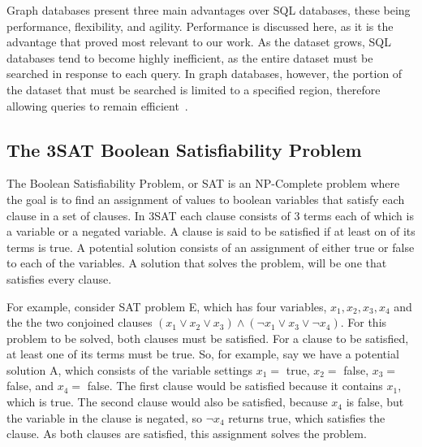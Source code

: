 \documentclass[12pt]{article}
\begin{document}
Graph databases present three main advantages over SQL databases, these being performance, flexibility, and agility. Performance is discussed here, as it is the advantage that proved most relevant to our work. As the dataset grows, SQL databases tend to become highly inefficient, as the entire dataset must be searched in response to each query. In graph databases, however, the portion of the dataset that must be searched is limited to a specified region, therefore allowing queries to remain efficient~\cite{GraphDatabases:2013}.




\subsection{The 3SAT Boolean Satisfiability Problem}
\label{sec:3sat}
The Boolean Satisfiability Problem, or SAT is an NP-Complete problem where the goal is to find an assignment of values to boolean variables that satisfy each clause in a set of clauses. In 3SAT each clause consists of 3 terms each of which is a variable or a negated variable. A clause is said to be satisfied if at least on of its terms is true. A potential solution consists of an assignment of either true or false to each of the variables. A solution that solves the problem, will be one that satisfies every clause. 

For example, consider SAT problem E, which has four variables, $x_{1}, x_{2}, x_{3}, x_{4}$ and the the two conjoined clauses $(x_{1} \vee x_{2} \vee x_{3}) \wedge (\neg x_{1} \vee x_{3} \vee \neg x_{4})$. For this problem to be solved, both clauses must be satisfied. For a clause to be satisfied, at least one of its terms must be true. So, for example, say we have a potential solution A, which consists of the variable settings $x_{1} =$ true, $x_{2} =$ false, $x_{3} =$ false, and $x_{4} =$ false. The first clause would be satisfied because it contains $x_{1}$, which is true. The second clause would also be satisfied, because $x_{4}$ is false, but the variable in the clause is negated, so $\neg x_{4}$ returns true, which satisfies the clause. As both clauses are satisfied, this assignment solves the problem.	
\end{document}
